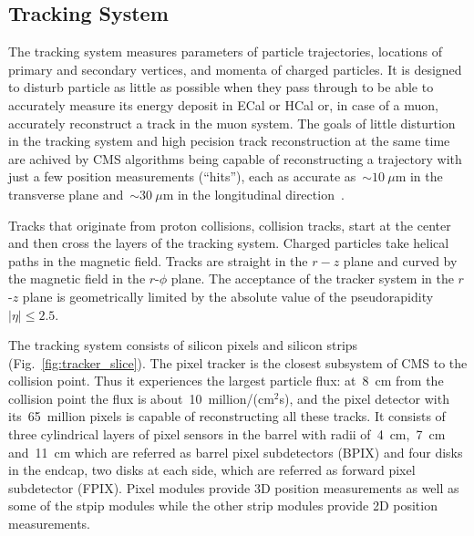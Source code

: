 \subsection{Tracking System}

The tracking system measures parameters of particle trajectories, locations of primary and secondary vertices, and momenta of charged particles. It is designed to disturb particle as little as possible when they pass through to be able to accurately measure its energy deposit in ECal or HCal or, in case of a muon, accurately reconstruct a track in the muon system. The goals of little disturtion in the tracking system and high pecision track reconstruction at the same time are achived by CMS algorithms being capable of reconstructing a trajectory with just a few position measurements (``hits''), each as accurate as~$\sim10~\mu$m in the transverse plane and~$\sim30~\mu$m in the longitudinal direction~\cite{ref_trackerPerformance}.

Tracks that originate from proton collisions, collision tracks, start at the center and then cross the layers of the tracking system. Charged particles take helical paths in the magnetic field. Tracks are straight in the $r-z$ plane and curved by the magnetic field in the $r$-$\phi$ plane. The acceptance of the tracker system in the $r$-$z$ plane is geometrically limited by the absolute value of the pseudorapidity $|\eta| \leq 2.5$.

The tracking system consists of silicon pixels and silicon strips (Fig.~\ref{fig:tracker_slice}). The pixel tracker is the closest subsystem of CMS to the collision point. Thus it experiences the largest particle flux: at~8~cm from the collision point the flux is about~10~million/(cm$^2$s), and the pixel detector with its~65~million pixels is capable of reconstructing all these tracks. It consists of three cylindrical layers of pixel sensors in the barrel with radii of~4~cm,~7~cm and~11~cm which are referred as barrel pixel subdetectors (BPIX) and four disks in the endcap, two disks at each side, which are referred as forward pixel subdetector (FPIX). Pixel modules provide 3D position measurements as well as some of the stpip modules while the other strip modules provide 2D position measurements.

